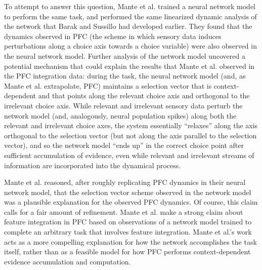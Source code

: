 \documentclass[12pt,a4paper,final]{iopart}
\begin{document}
To attempt to answer this question, Mante et al. trained a neural network model to perform the same task, and performed the same linearized dynamic analysis of the network that Barak and Sussillo had developed earlier. They found that the dynamics observed in PFC (the scheme in which sensory data induces perturbations along a choice axis towards a choice variable) were also observed in the neural network model. Further analysis of the network model uncovered a potential mechanism that could explain the results that Mante et al. observed in the PFC integration data: during the task, the neural network model (and, as Mante et al. extrapolate, PFC) maintains a selection vector that is context-dependent and that points along the relevant choice axis and orthogonal to the irrelevant choice axis. While relevant and irrelevant sensory data perturb the network model (and, analogously, neural population spikes) along both the relevant and irrelevant choice axes, the system essentially “relaxes” along the axis orthogonal to the selection vector (but not along the axis parallel to the selection vector), and so the network model ``ends up'' in the correct choice point after sufficient accumulation of evidence, even while relevant and irrelevant streams of information are incorporated into the dynamical process.

Mante et al. reasoned, after roughly replicating PFC dynamics in their neural network model, that the selection vector scheme observed in the network model was a plausible explanation for the observed PFC dynamics. Of course, this claim calls for a fair amount of refinement. Mante et al. make a strong claim about feature integration in PFC based on observations of a network model trained to complete an arbitrary task that involves feature integration. Mante et al.'s work acts as a more compelling explanation for how the network accomplishes the task itself, rather than as a feasible model for how PFC performs context-dependent evidence accumulation and computation.
\end{document}
